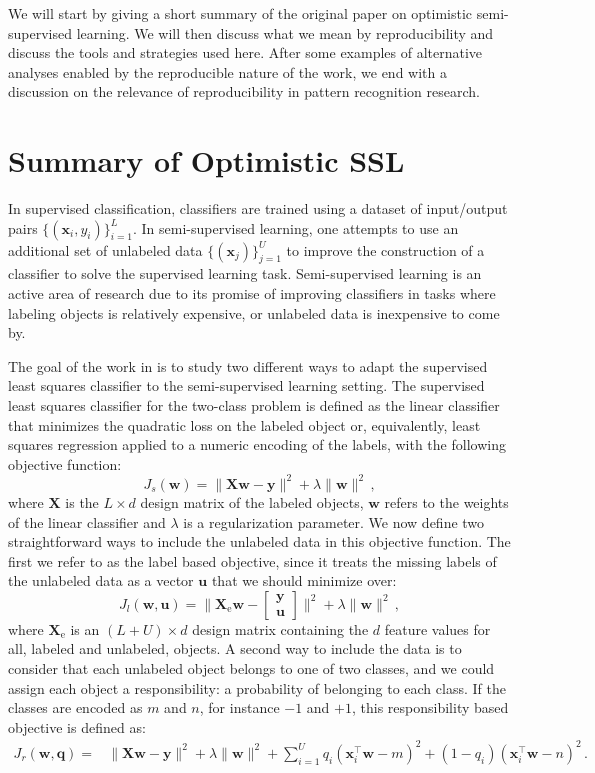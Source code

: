 \documentclass[runningheads,a4paper]{llncs}\usepackage[]{graphicx}\usepackage[]{color}
\newcommand{\Xe}{\mathbf{X}_\textrm{e}}
\begin{document}
We will start by giving a short summary of the original paper on optimistic semi-supervised learning. We will then discuss what we mean by reproducibility and discuss the tools and strategies used here. After some examples of alternative analyses enabled by the reproducible nature of the work, we end with a discussion on the relevance of reproducibility in pattern recognition research.

\section{Summary of Optimistic SSL}
In supervised classification, classifiers are trained using a dataset of input/output pairs $\{(\mathbf{x}_i,y_i)\}^L_{i=1}$. In semi-supervised learning, one attempts to use an additional set of unlabeled data $\{(\mathbf{x}_j)\}^U_{j=1}$ to improve the construction of a classifier to solve the supervised learning task. Semi-supervised learning is an active area of research due to its promise of improving classifiers in tasks where labeling objects is relatively expensive, or unlabeled data is inexpensive to come by.

The goal of the work in \cite{Krijthe2016a} is to study two different ways to adapt the supervised least squares classifier to the semi-supervised learning setting. The supervised least squares classifier for the two-class problem is defined as the linear classifier that minimizes the quadratic loss on the labeled object or, equivalently, least squares regression applied to a numeric encoding of the labels, with the following objective function:
\begin{equation}
J_s(\mathbf{w}) = \| \mathbf{X} \mathbf{w}-\mathbf{y} \|^2 + \lambda \|\mathbf{w} \|^2 \,,
\end{equation}
where $\mathbf{X}$ is the $L \times d$ design matrix of the labeled objects, $\mathbf{w}$ refers to the weights of the linear classifier and $\lambda$ is a regularization parameter. We now define two straightforward ways to include the unlabeled data in this objective function. The first we refer to as the label based objective, since it treats the missing labels of the unlabeled data as a vector $\mathbf{u}$ that we should minimize over:
$$
J_l(\mathbf{w},\mathbf{u}) = \| \Xe \mathbf{w}-\begin{bmatrix} \mathbf{y} \\ \mathbf{u} \end{bmatrix} \|^2 + \lambda \|\mathbf{w} \|^2 \,,
$$
where $\Xe$ is an $(L+U) \times d$ design matrix containing the $d$ feature values for all, labeled and unlabeled, objects.
A second way to include the data is to consider that each unlabeled object belongs to one of two classes, and we could assign each object a responsibility: a probability of belonging to each class. If the classes are encoded as $m$ and $n$, for instance $-1$ and $+1$, this responsibility based objective is defined as:
\begin{align}
J_r(\mathbf{w},\mathbf{q}) = & \| \mathbf{X} \mathbf{w}-\mathbf{y} \|^2 + \lambda \|\mathbf{w} \|^2 \nonumber + \sum_{i=1}^{U}  q_i (\mathbf{x}_i^\top \mathbf{w} - m)^2  + (1-q_i) (\mathbf{x}_i^\top \mathbf{w} - n)^2 \,. \nonumber
\end{align}
\end{document}
